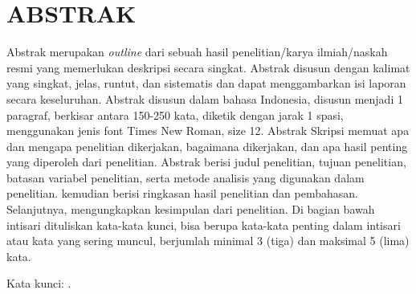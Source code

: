 \begingroup
\singlespacing

\chapter*{ABSTRAK}

\noindent
Abstrak merupakan \emph{outline} dari sebuah hasil
penelitian/karya ilmiah/naskah resmi yang memerlukan deskripsi
secara singkat. Abstrak disusun dengan kalimat yang singkat,
jelas, runtut, dan sistematis dan dapat menggambarkan isi laporan
secara keseluruhan. Abstrak disusun dalam bahasa Indonesia,
disusun menjadi 1 paragraf, berkisar antara 150-250 kata, diketik
dengan jarak 1 spasi, menggunakan jenis font Times New Roman,
size 12. Abstrak Skripsi memuat apa dan mengapa penelitian
dikerjakan, bagaimana dikerjakan, dan apa hasil penting yang
diperoleh dari penelitian. Abstrak berisi judul penelitian,
tujuan penelitian, batasan variabel penelitian, serta metode
analisis yang digunakan dalam penelitian. kemudian berisi
ringkasan hasil penelitian dan pembahasan. Selanjutnya,
mengungkapkan kesimpulan dari penelitian. Di bagian bawah
intisari dituliskan kata-kata kunci, bisa berupa kata-kata
penting dalam intisari atau kata yang sering muncul, berjumlah
minimal 3 (tiga) dan maksimal 5 (lima) kata.

\vspace{1em}
\noindent Kata kunci: \KataKunci.

\clearpage
\endgroup
